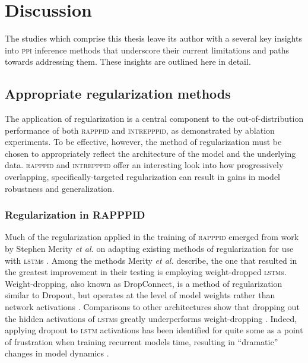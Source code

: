 \chapter{Discussion}

The studies which comprise this thesis leave its author with a several key insights into \textsc{ppi} inference methods that underscore their current limitations and paths towards addressing them. These insights are outlined here in detail.

\section*{Appropriate regularization methods}

The application of regularization is a central component to the out-of-distribution performance of both \textsc{rapppid} and \textsc{intrepppid}, as demonstrated by ablation experiments. To be effective, however, the method of regularization must be chosen to appropriately reflect the architecture of the model and the underlying data. \textsc{rapppid} and \textsc{intrepppid} offer an interesting look into how progressively overlapping, specifically-targeted regularization can result in gains in model robustness and generalization. 

\subsection*{Regularization in RAPPPID}

Much of the regularization applied in the training of \textsc{rapppid} emerged from work by Stephen Merity \textit{et al.} on adapting existing methods of regularization for use with \textsc{lstm}s \cite{awd_lstm}. Among the methods Merity \textit{et al.} describe, the one that resulted in the greatest improvement in their testing is employing weight-dropped \textsc{lstm}s. Weight-dropping, also known as DropConnect, is a method of regularization similar to Dropout, but operates at the level of model weights rather than network activations \cite{dropconnect, dropout}. Comparisons to other architectures show that dropping out the hidden activations of \textsc{lstm}s greatly underperforms weight-dropping \cite{awd_lstm}. Indeed, applying dropout to \textsc{lstm} activations has been identified for quite some as a point of frustration when training recurrent models  time, resulting in ``dramatic'' changes in model dynamics \cite{fast_dropout}.

